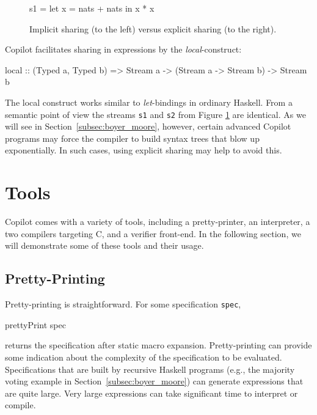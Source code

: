 \documentclass[]{article}
\theoremstyle{example}
\begin{document}
\begin{figure}[ht]
\begin{minipage}{0.5\textwidth}
\begin{code}
s1 = let x = nats + nats
     in x * x
\end{code}
\end{minipage}
\begin{minipage}{0.5\textwidth}
\end{minipage}
\caption{Implicit sharing (to the left) versus explicit sharing (to the right).}
\label{fig:explicit_sharing}
\end{figure}
\noindent Copilot facilitates sharing in expressions by the \emph{local}-construct:
%
\begin{code}
local
  :: (Typed a, Typed b)
  => Stream a
  -> (Stream a -> Stream b)
  -> Stream b
\end{code}
%
The local construct works similar to \emph{let}-bindings in ordinary Haskell.
From a semantic point of view the streams {\tt s1} and {\tt s2} from Figure
\ref{fig:explicit_sharing} are identical.
As we will see in Section~\ref{subsec:boyer_moore}, however, certain advanced
Copilot programs may force the compiler to build syntax trees that blow up exponentially.
In such cases, using explicit sharing may help to avoid this.

\section{Tools}

Copilot comes with a variety of tools, including a pretty-printer, an interpreter,
a two compilers targeting C, and a verifier front-end. In the following section, we will
demonstrate some of these tools and their usage.

\subsection{Pretty-Printing}
Pretty-printing is straightforward.  For some specification {\tt spec},
%
\begin{code}
prettyPrint spec
\end{code}
%
\noindent
returns the specification after static macro expansion.  Pretty-printing can
provide some indication about the complexity of the specification to be
evaluated.  Specifications that are built by recursive Haskell programs (e.g.,
the majority voting example in Section~\ref{subsec:boyer_moore}) can generate
expressions that are quite large.  Very large expressions can take significant
time to interpret or compile.
\end{document}
